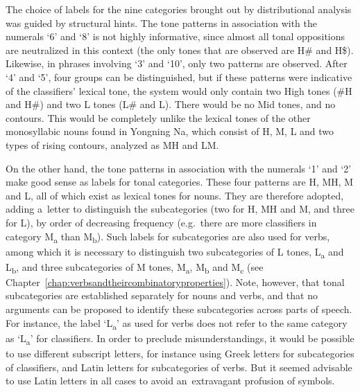 The choice of labels for the
nine categories brought out by distributional analysis was guided by structural hints. The tone patterns in association with the numerals ‘6’ and ‘8’ is not highly informative, since almost all tonal oppositions are
neutralized in this context (the only tones that are observed are H\# and H\$). Likewise, in phrases
involving ‘3’ and ‘10’, only two patterns are observed. After ‘4’ and ‘5’, four groups can be
distinguished, but if these patterns were indicative of the classifiers’ lexical tone, the system
would only contain two High tones (\#H and H\#) and two L tones (L\# and L). There would be no Mid
tones, and no contours. This would be completely unlike the lexical tones of the other {monosyllabic}
nouns found in Yongning Na, which consist of H, M, L and two types of rising contours, analyzed as
MH and LM.

On the other hand, the tone patterns in association with the numerals ‘1’ and ‘2’ make good sense as
labels for tonal categories. These four patterns are H, MH, M and L, all of which exist as lexical
tones for nouns. They are therefore adopted, adding a~letter to distinguish the
subcategories (two for H, MH and M, and three for L), by order of decreasing frequency (e.g.~there
are more classifiers in category M\textsubscript{a} than M\textsubscript{b}). Such labels for subcategories are also used for verbs,
among which it is necessary to distinguish two subcategories of L tones, L\textsubscript{a} and L\textsubscript{b}, and three
subcategories of M tones, M\textsubscript{a}, M\textsubscript{b} and M\textsubscript{c} (see Chapter~\ref{chap:verbsandtheircombinatoryproperties}). Note, however, that tonal subcategories are
established separately for nouns and verbs, and that no arguments can be proposed to identify these
subcategories across parts of speech. For instance, the label ‘L\textsubscript{a}’ as used for verbs does not refer
to the same category as ‘L\textsubscript{a}’ for classifiers. In order to preclude misunderstandings, it would be
possible to use different subscript letters, for instance using Greek letters for subcategories of
classifiers, and Latin letters for subcategories of verbs. But it seemed advisable to use Latin letters in all cases
to avoid an~extravagant profusion of symbols.

